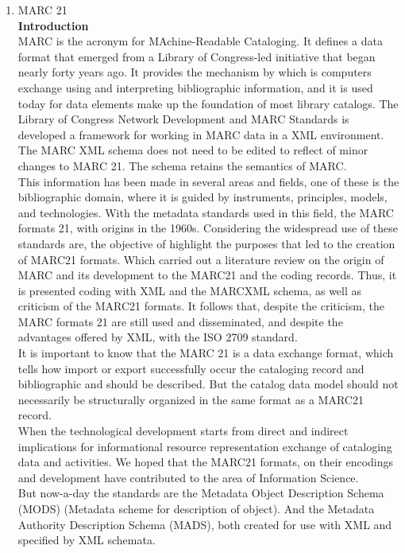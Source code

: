 \begin{enumerate}
	\item MARC 21\\
	{\bf Introduction}\\
	MARC is the acronym for MAchine-Readable Cataloging. 
	It defines a data format that emerged from a Library of Congress-led initiative that began nearly forty years ago. 
	It provides the mechanism by which is computers exchange using and interpreting bibliographic information, 
	and it is used today for data elements make up the foundation of most library catalogs.
	The Library of Congress Network Development and MARC Standards is developed a framework for working in MARC data in a XML environment. 
	The MARC XML schema does not need to be edited to reflect of minor changes to MARC 21. 
	The schema retains the semantics of MARC.\\
	This information has been made in several areas and fields, one of these is the bibliographic domain, where it is guided by instruments, principles, models, and technologies. 
	With the metadata standards used in this field, the MARC formats 21, with origins in the 1960s. 
	Considering the widespread use of these standards are, the objective of highlight the purposes that led to the creation of MARC21 formats. 
	Which carried out a literature review on the origin of MARC and its development to the MARC21 and the coding records. 
	Thus, it is presented coding with XML and the MARCXML schema, as well as criticism of the MARC21 formats. 
	It follows that, despite the criticism, the MARC formats 21 are still used and disseminated, and despite the advantages offered by XML, with the ISO 2709 standard. \\
	It is important to know that the MARC 21 is a data exchange format, which tells how import or export successfully occur the cataloging record and bibliographic and should be described. 
	But the catalog data model should not necessarily be structurally organized in the same format as a MARC21 record. \\
	When the technological development starts from direct and indirect implications for informational resource representation exchange of cataloging data and activities. 
	We hoped that the MARC21 formats, on their encodings and development have contributed to the area of Information Science. \\
	But now-a-day the standards are the Metadata Object Description Schema (MODS) (Metadata scheme for description of object).
	And the Metadata Authority Description Schema (MADS), both created for use with XML and specified by XML schemata. \\

\end{enumerate}
